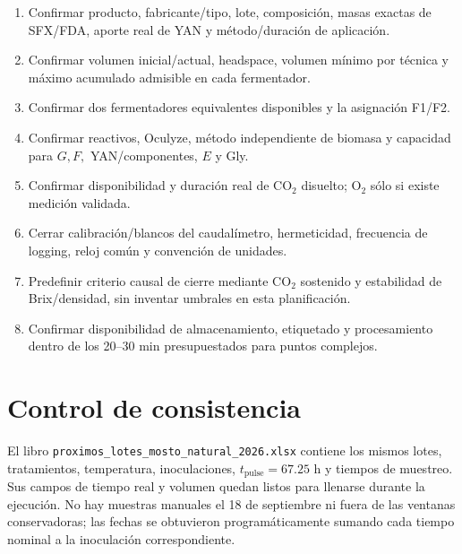 \documentclass[11pt,a4paper]{article}
\begin{document}
\begin{enumerate}[leftmargin=*]
  \item Confirmar producto, fabricante/tipo, lote, composición, masas exactas de
  SFX/FDA, aporte real de YAN y método/duración de aplicación.
  \item Confirmar volumen inicial/actual, headspace, volumen mínimo por técnica y
  máximo acumulado admisible en cada fermentador.
  \item Confirmar dos fermentadores equivalentes disponibles y la asignación
  F1/F2.
  \item Confirmar reactivos, Oculyze, método independiente de biomasa y capacidad
  para \(G,F,\) YAN/componentes, \(E\) y Gly.
  \item Confirmar disponibilidad y duración real de CO$_2$ disuelto; O$_2$ sólo
  si existe medición validada.
  \item Cerrar calibración/blancos del caudalímetro, hermeticidad, frecuencia de
  logging, reloj común y convención de unidades.
  \item Predefinir criterio causal de cierre mediante CO$_2$ sostenido y
  estabilidad de Brix/densidad, sin inventar umbrales en esta planificación.
  \item Confirmar disponibilidad de almacenamiento, etiquetado y procesamiento
  dentro de los 20--30 min presupuestados para puntos complejos.
\end{enumerate}

\section*{Control de consistencia}

El libro \texttt{proximos\_lotes\_mosto\_natural\_2026.xlsx} contiene los mismos
lotes, tratamientos, temperatura, inoculaciones, \(t_{\mathrm{pulse}}=67.25\) h
y tiempos de muestreo. Sus campos de tiempo real y volumen quedan listos para
llenarse durante la ejecución. No hay muestras manuales el 18 de septiembre ni
fuera de las ventanas conservadoras; las fechas se obtuvieron programáticamente
sumando cada tiempo nominal a la inoculación correspondiente.
\end{document}
